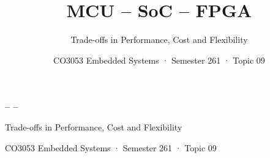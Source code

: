 \documentclass[aspectratio=169,11pt]{beamer}
\title{\textbf{MCU – SoC – FPGA}}
\subtitle{Trade-offs in Performance, Cost and Flexibility}
\author{CO3053 Embedded Systems · Semester 261 · Topic 09}
\date{}
\begin{document}
\begin{frame}[plain]
\vfill
{\Huge\bfseries \MCU{} – \SoC{} – \FPGA}\par\medskip
{\Large Trade-offs in Performance, Cost and Flexibility}\par\bigskip
{\color{cInk2} CO3053 Embedded Systems · Semester 261 · Topic 09}
\vfill
\end{frame}


\end{document}
